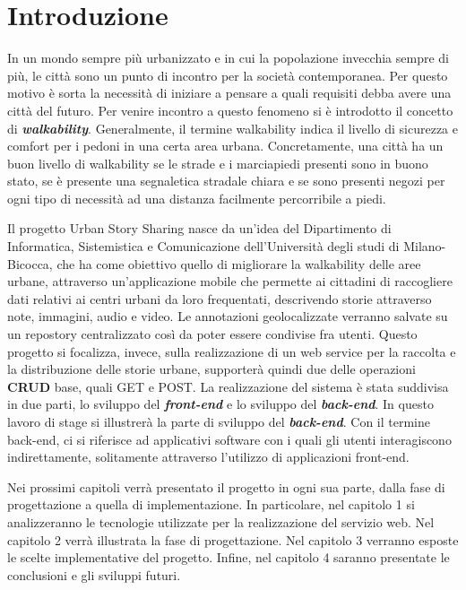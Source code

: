 \chapter*{Introduzione}



In un mondo sempre più urbanizzato e in cui la popolazione invecchia sempre di più, le città sono un punto di incontro per la società contemporanea. Per questo motivo è sorta la necessità di iniziare a pensare a quali requisiti debba avere una città del futuro. Per venire incontro a questo fenomeno si è introdotto il concetto di \textit{\textbf{walkability}}. Generalmente, il termine walkability indica il livello di sicurezza e comfort per i pedoni in una certa area urbana. Concretamente, una città ha un buon livello di walkability se le strade e i marciapiedi presenti sono in buono stato, se è presente una segnaletica stradale chiara e se sono presenti negozi per ogni tipo di necessità ad una distanza facilmente percorribile a piedi.

Il progetto Urban Story Sharing nasce da un'idea del Dipartimento di Informatica, Sistemistica e Comunicazione dell'Università degli studi di Milano-Bicocca, che ha come obiettivo quello di migliorare la walkability delle aree urbane, attraverso un'applicazione mobile che permette ai cittadini di raccogliere dati relativi ai centri urbani da loro frequentati, descrivendo storie attraverso note, immagini, audio e video. Le annotazioni geolocalizzate verranno salvate su un repostory centralizzato così da poter essere condivise fra utenti. Questo progetto si focalizza, invece, sulla realizzazione di un web service per la raccolta e la distribuzione delle storie urbane, supporterà quindi due delle operazioni \textbf{CRUD} base, quali GET e POST. 
La realizzazione del sistema è stata suddivisa in due parti, lo sviluppo del \textit{\textbf{front-end}} e lo sviluppo del \textit{\textbf{back-end}}.
In questo lavoro di stage si illustrerà la parte di sviluppo del \textit{\textbf{back-end}}.
Con il termine back-end, ci si riferisce ad applicativi software con i quali gli utenti interagiscono indirettamente, solitamente attraverso l'utilizzo di applicazioni front-end.

Nei prossimi capitoli verrà presentato il progetto in ogni sua parte, dalla fase di progettazione a quella di implementazione.  In particolare, nel capitolo 1 si analizzeranno le tecnologie utilizzate per la realizzazione del servizio web. Nel capitolo 2 verrà illustrata la fase di progettazione. Nel capitolo 3 verranno esposte le scelte implementative del progetto. Infine, nel capitolo 4 saranno presentate le conclusioni e gli sviluppi futuri.

